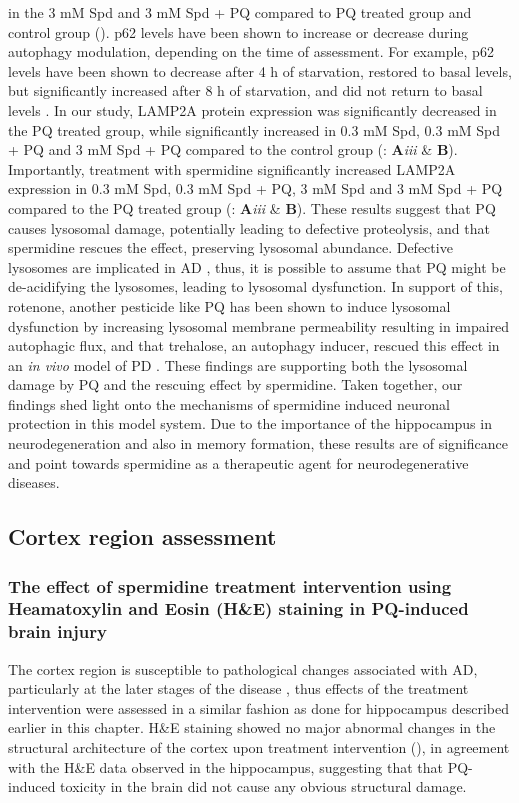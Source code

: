 in the 3 mM Spd and 3 mM Spd + PQ compared to PQ treated group and control group (). p62 levels have been shown to increase or decrease during autophagy modulation, depending on the time of assessment. For example, p62 levels have been shown to decrease after 4 h of starvation, restored to basal levels, but significantly increased after 8 h of starvation, and did not return to basal levels \citep{sahani2014}. In our study, LAMP2A protein expression was significantly decreased in the PQ treated group, while significantly increased in 0.3 mM Spd, 0.3 mM Spd + PQ and 3 mM Spd + PQ compared to the control group (: \textbf{A}\textit{iii} \& \textbf{B}). Importantly, treatment with spermidine significantly increased LAMP2A expression in 0.3 mM Spd, 0.3 mM Spd + PQ, 3 mM Spd and 3 mM Spd + PQ compared to the PQ treated group (: \textbf{A}\textit{iii} \& \textbf{B}). These results suggest that PQ causes lysosomal damage, potentially leading to defective proteolysis, and that spermidine rescues the effect, preserving lysosomal abundance. Defective lysosomes are implicated in AD \citep{Nixon2011}, thus, it is possible to assume that PQ might be de-acidifying the lysosomes, leading to lysosomal dysfunction. In support of this, rotenone, another pesticide like PQ has been shown to induce lysosomal dysfunction by increasing lysosomal membrane permeability resulting in impaired autophagic flux, and that trehalose, an autophagy inducer, rescued this effect in an \textit{in vivo} model of PD \citep{Wu2015}. These findings are supporting both the lysosomal damage by PQ and the rescuing effect by spermidine. Taken together, our findings shed light onto the mechanisms of spermidine induced neuronal protection in this model system. Due to the importance of the hippocampus in neurodegeneration and also in memory formation, these results are of significance and point towards spermidine as a therapeutic agent for neurodegenerative diseases.

\subsection{Cortex region assessment}
\subsubsection{The effect of spermidine treatment intervention using Heamatoxylin and Eosin (H\&E) staining in PQ-induced brain injury}
The cortex region is susceptible to pathological changes associated with AD, particularly at the later stages of the disease \citep{Braak1998,Braak1991,Braak2012}, thus effects of the treatment intervention were assessed in a similar fashion as done for hippocampus described earlier in this chapter. H\&E staining showed no major abnormal changes in the structural architecture of the cortex upon treatment intervention (), in agreement with the H\&E data observed in the hippocampus, suggesting that that PQ-induced toxicity in the brain did not cause any obvious structural damage. 

